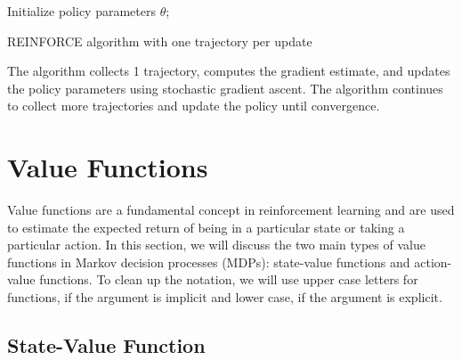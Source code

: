 \begin{algorithm}[H]
    \SetAlgoLined
        Initialize policy parameters $\theta$;
    \caption{REINFORCE algorithm with one trajectory per update}
\end{algorithm}
    
The algorithm collects 1 trajectory, computes the gradient estimate, and updates the policy parameters using stochastic gradient ascent. The algorithm continues to collect more trajectories and update the policy until convergence.


\section{Value Functions}

Value functions are a fundamental concept in reinforcement learning and are used to estimate the expected return of being in a particular state or taking a particular action. In this section, we will discuss the two main types of value functions in Markov decision processes (MDPs): state-value functions and action-value functions.
To clean up the notation, we will use upper case letters for functions, if the argument 
is implicit and lower case, if the argument is explicit.

\subsection{State-Value Function}

